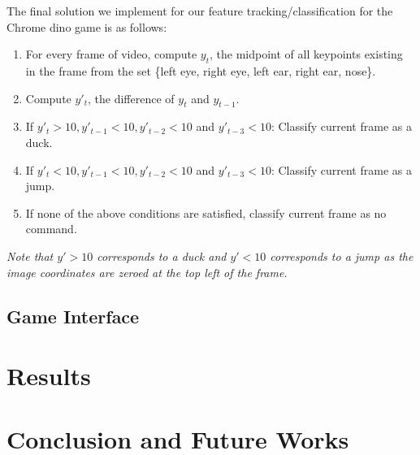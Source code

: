 \documentclass[10pt,twocolumn,letterpaper]{article}
\begin{document}
The final solution we implement for our feature tracking/classification for 
the Chrome dino game is as follows:

\begin{enumerate}
    \item For every frame of video, compute $y_t$, the midpoint of all keypoints 
        existing in the frame from the set 
        \{left eye, right eye, left ear, right ear, nose\}.
    \item Compute $y'_t$, the difference of $y_t$ and $y_{t-1}$.
    \item If $y'_t > 10, y'_{t-1} < 10, y'_{t-2} < 10$ and $y'_{t-3} < 10$: 
        Classify current frame as a duck.
    \item If $y'_t < 10, y'_{t-1} < 10, y'_{t-2} < 10$ and $y'_{t-3} < 10$:
        Classify current frame as a jump.
    \item If none of the above conditions are satisfied, classify current frame as 
        no command.
\end{enumerate}

\textit{Note that $y' > 10$ corresponds to a duck and $y' < 10$ corresponds 
to a jump as the image coordinates are zeroed at the top left of the frame.}

\subsection{Game Interface}

\section{Results}

\section{Conclusion and Future Works}

{\small


}
\end{document}
